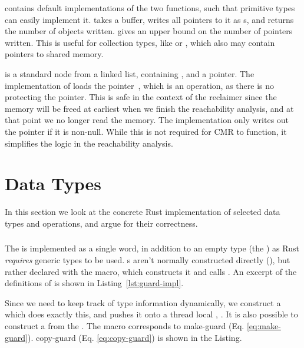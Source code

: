  contains default implementations of the two functions, such that primitive types can
easily implement it.  takes a buffer, writes all pointers to it as s,
and returns the number of objects written.  gives an upper bound on the number of
pointers written. This is useful for collection types, like  or , which
also may contain pointers to shared memory.

 is a standard node from a linked list, containing , and a 
pointer. The implementation of  loads the  pointer~, which is
an  operation, as there is no  protecting the pointer. This is safe in the
context of the reclaimer since the memory will be freed at earliest when we finish the reachability
analysis, and at that point we no longer read the memory. The implementation only writes out the
pointer if it is non-null. While this is not required for CMR to function, it simplifies the logic
in the reachability analysis.


\section{Data Types\label{sec:data-types}}

In this section we look at the concrete Rust implementation of selected data types and operations,
and argue for their correctness.

\subsubsection{}

The  is implemented as a single word, in addition to an empty type (the
) as Rust \emph{requires} generic types to be used. s aren't normally
constructed directly (), but rather declared with the
 macro, which constructs it and calls .
An excerpt of the definitions of  is shown in Listing~\ref{lst:guard-impl}.
\begin{figure}[t]
  
\end{figure}

Since we need to keep track of type information dynamically, we construct a 
which does exactly this, and pushes it onto a thread local , .  It is also
possible to construct a  from the .
The  macro corresponds to make-guard (Eq. \ref{eq:make-guard}). copy-guard
(Eq. \ref{eq:copy-guard}) is shown in the Listing.

